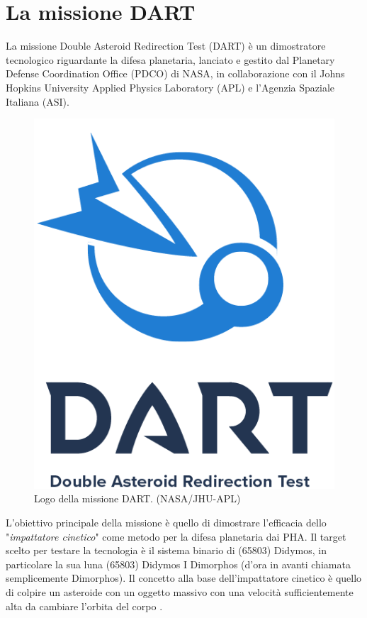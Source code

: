 \documentclass[a4paper,11pt,openright]{book}
\begin{document}
\chapter{La missione DART}\label{ch:ch_3}

La missione Double Asteroid Redirection Test (DART) è un dimostratore tecnologico riguardante la difesa planetaria, lanciato e gestito dal Planetary Defense Coordination Office (PDCO) di NASA, in collaborazione con il Johns Hopkins University Applied Physics Laboratory (APL) e l'Agenzia Spaziale Italiana (ASI).

\begin{figure}[!h]
    \centering
    \includegraphics[scale=0.5]{figure/DART_mission_patch.png}
    \caption[Logo della missione DART]{Logo della missione DART. (NASA/JHU-APL)}
    \label{fig:logo_DART}
\end{figure}

L'obiettivo principale della missione è quello di dimostrare l'efficacia dello "\textit{impattatore cinetico}" come metodo per la difesa planetaria dai PHA. Il target scelto per testare la tecnologia è il sistema binario di (65803) Didymos, in particolare la sua luna (65803) Didymos I Dimorphos (d'ora in avanti chiamata semplicemente Dimorphos). Il concetto alla base dell'impattatore cinetico è quello di colpire un asteroide con un oggetto massivo con una velocità sufficientemente alta da cambiare l'orbita del corpo \citep{rivkin_double_2021}.
\end{document}
